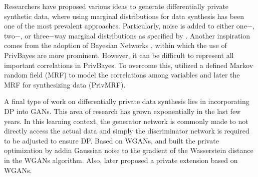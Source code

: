 Researchers have proposed various ideas to generate differentially private synthetic data, where using marginal distributions for data synthesis has been one of the most prevalent approaches. Particularly, noise is added to either one$-$, two$-$, or three$-$way marginal distributions
as specified by \citet{mckenna2019graphical}. Another inspiration comes from the adoption of Bayesian Networks \citep{bao2021synthetic}, within which the use of PrivBayes \citet{zhang2017privbayes} are more prominent. However, it can be difficult to 
represent all important correlations in PrivBayes. To overcome this, \citet{cai2021data} utilized a defined Markov random field (MRF) to model the correlations among variables and later the MRF for synthesizing data (PrivMRF).

A final type of work on differentially private data synthesis lies in incorporating DP into GANs. This area of research has grown exponentially in the last few years. In this learning context, the generator network is commonly made to not directly access the actual data and simply the discriminator network is required to be adjusted to ensure DP. Based on WGANs, \citet{xie2018differentially} and \citet{beaulieu2019privacy} built the private optimization by addin Gaussian noise to the gradient of the Wasserstein distance in the WGANs algorithm. Also, \citet{frigerio2019differentially} later proposed a private extension based on WGANs.
